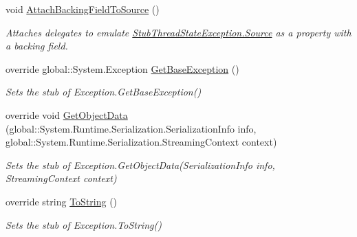 \begin{DoxyCompactItemize}
void \hyperlink{class_system_1_1_threading_1_1_fakes_1_1_stub_thread_state_exception_a8bb64616af042c16b5db03dc0adef95f}{Attach\-Backing\-Field\-To\-Source} ()
\begin{DoxyCompactList}\small\item\em Attaches delegates to emulate \hyperlink{class_system_1_1_threading_1_1_fakes_1_1_stub_thread_state_exception_a54013b74412bd619f2540b4bba75f523}{Stub\-Thread\-State\-Exception.\-Source} as a property with a backing field.\end{DoxyCompactList}\item 
override global\-::\-System.\-Exception \hyperlink{class_system_1_1_threading_1_1_fakes_1_1_stub_thread_state_exception_aa790c449d30d358264c9043c1eb55c7f}{Get\-Base\-Exception} ()
\begin{DoxyCompactList}\small\item\em Sets the stub of Exception.\-Get\-Base\-Exception()\end{DoxyCompactList}\item 
override void \hyperlink{class_system_1_1_threading_1_1_fakes_1_1_stub_thread_state_exception_a6850804a1c66e3f5c23c2255c3fba781}{Get\-Object\-Data} (global\-::\-System.\-Runtime.\-Serialization.\-Serialization\-Info info, global\-::\-System.\-Runtime.\-Serialization.\-Streaming\-Context context)
\begin{DoxyCompactList}\small\item\em Sets the stub of Exception.\-Get\-Object\-Data(\-Serialization\-Info info, Streaming\-Context context)\end{DoxyCompactList}\item 
override string \hyperlink{class_system_1_1_threading_1_1_fakes_1_1_stub_thread_state_exception_a5b4471e73f5b769a87291271ee9d1bef}{To\-String} ()
\begin{DoxyCompactList}\small\item\em Sets the stub of Exception.\-To\-String()\end{DoxyCompactList}\end{DoxyCompactItemize}

